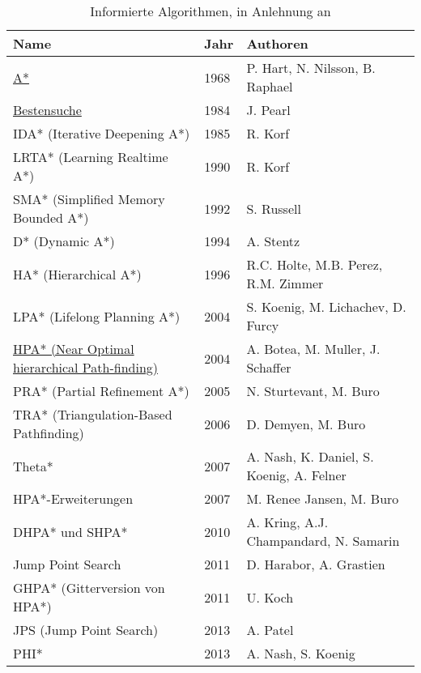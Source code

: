 \begin{table}[h]
	\begin{tabular}[h]{L{8cm}|C{1cm}|L{5cm}}
		\hline
		\textbf{Name}                                          & \textbf{Jahr} & \textbf{Authoren}                                 \\ \hline
		\hyperref[sec:astar]{A*}                                            & 1968 & P. Hart, N. Nilsson, B. Raphael          \\ \hline
		\hyperref[sec:bestsearch]{Bestensuche}                            & 1984 & J. Pearl                                 \\ \hline
		IDA* (Iterative Deepening A*)                 & 1985 & R. Korf                                  \\ \hline
		LRTA* (Learning Realtime A*)                  & 1990 & R. Korf                                  \\ \hline
		SMA* (Simplified Memory Bounded A*)            & 1992 & S. Russell                               \\ \hline
		D* (Dynamic A*)                                & 1994 & A. Stentz                                \\ \hline
		HA* (Hierarchical A*)                          & 1996 & R.C. Holte, M.B. Perez, R.M. Zimmer      \\ \hline
		LPA* (Lifelong Planning A*)                   & 2004 & S. Koenig, M. Lichachev, D. Furcy        \\ \hline
		\hyperref[sec:hpa]{HPA* (Near Optimal hierarchical Path-finding)} & 2004 & A. Botea, M. Muller, J. Schaffer         \\ \hline
		PRA* (Partial Refinement A*)                   & 2005 & N. Sturtevant, M. Buro                   \\ \hline
		TRA* (Triangulation-Based Pathfinding)         & 2006 & D. Demyen, M. Buro                       \\ \hline
		Theta*                                        & 2007 & A. Nash, K. Daniel, S. Koenig, A. Felner \\ \hline
		HPA*-Erweiterungen                          & 2007 & M. Renee Jansen, M. Buro                 \\ \hline
		DHPA* und SHPA*                               & 2010 & A. Kring, A.J. Champandard, N. Samarin   \\ \hline
		Jump Point Search                             & 2011 & D. Harabor, A. Grastien                  \\ \hline
		GHPA* (Gitterversion von HPA*)                 & 2011 & U. Koch                                  \\ \hline
		JPS (Jump Point Search)                       & 2013 & A. Patel                                 \\ \hline
		PHI*                                          & 2013 & A. Nash, S. Koenig                       \\ \hline
	\end{tabular}
	\caption{\label{tab:informed}Informierte Algorithmen, in Anlehnung an \cite[S.233]{Noo15}}
\end{table}


